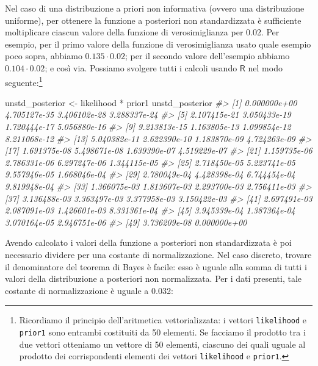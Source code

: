 \documentclass[
]{memoir}
\newenvironment{Shaded}{\begin{snugshade}}{\end{snugshade}}
\newcommand{\CommentTok}[1]{\textcolor[rgb]{0.56,0.35,0.01}{\textit{#1}}}
\newcommand{\NormalTok}[1]{#1}
\newcommand{\OtherTok}[1]{\textcolor[rgb]{0.56,0.35,0.01}{#1}}
\newcommand{\SpecialCharTok}[1]{\textcolor[rgb]{0.00,0.00,0.00}{#1}}
\newcommand{\R}{\textsf{R}} %
\begin{document}
Nel caso di una distribuzione a priori non informativa (ovvero una distribuzione uniforme), per ottenere la funzione a posteriori non standardizzata è sufficiente moltiplicare ciascun valore della funzione di verosimiglianza per 0.02. Per esempio, per il primo valore della funzione di verosimiglianza usato quale esempio poco sopra, abbiamo \(0.135 \cdot 0.02\); per il secondo valore dell'esempio abbiamo \(0.104 \cdot 0.02\); e così via. Possiamo svolgere tutti i calcoli usando \(\R\) nel modo seguente:\footnote{Ricordiamo il principio dell'aritmetica vettorializzata: i vettori \texttt{likelihood} e \texttt{prior1} sono entrambi costituiti da 50 elementi. Se facciamo il prodotto tra i due vettori otteniamo un vettore di 50 elementi, ciascuno dei quali uguale al prodotto dei corrispondenti elementi dei vettori \texttt{likelihood} e \texttt{prior1}.}

\begin{Shaded}
\begin{Highlighting}[]
\NormalTok{unstd\_posterior }\OtherTok{\textless{}{-}}\NormalTok{ likelihood }\SpecialCharTok{*}\NormalTok{ prior1}
\NormalTok{unstd\_posterior}
\CommentTok{\#\textgreater{}  [1] 0.000000e+00 4.705127e{-}35 3.406102e{-}28 3.288337e{-}24}
\CommentTok{\#\textgreater{}  [5] 2.107415e{-}21 3.050433e{-}19 1.720444e{-}17 5.056880e{-}16}
\CommentTok{\#\textgreater{}  [9] 9.213813e{-}15 1.163805e{-}13 1.099854e{-}12 8.211068e{-}12}
\CommentTok{\#\textgreater{} [13] 5.040382e{-}11 2.622390e{-}10 1.183870e{-}09 4.724263e{-}09}
\CommentTok{\#\textgreater{} [17] 1.691375e{-}08 5.498671e{-}08 1.639390e{-}07 4.519229e{-}07}
\CommentTok{\#\textgreater{} [21] 1.159735e{-}06 2.786331e{-}06 6.297247e{-}06 1.344115e{-}05}
\CommentTok{\#\textgreater{} [25] 2.718450e{-}05 5.223741e{-}05 9.557946e{-}05 1.668046e{-}04}
\CommentTok{\#\textgreater{} [29] 2.780049e{-}04 4.428398e{-}04 6.744454e{-}04 9.819948e{-}04}
\CommentTok{\#\textgreater{} [33] 1.366075e{-}03 1.813607e{-}03 2.293700e{-}03 2.756411e{-}03}
\CommentTok{\#\textgreater{} [37] 3.136488e{-}03 3.363497e{-}03 3.377958e{-}03 3.150422e{-}03}
\CommentTok{\#\textgreater{} [41] 2.697491e{-}03 2.087091e{-}03 1.426601e{-}03 8.331361e{-}04}
\CommentTok{\#\textgreater{} [45] 3.945339e{-}04 1.387364e{-}04 3.070164e{-}05 2.946751e{-}06}
\CommentTok{\#\textgreater{} [49] 3.736209e{-}08 0.000000e+00}
\end{Highlighting}
\end{Shaded}

Avendo calcolato i valori della funzione a posteriori non standardizzata è poi necessario dividere per una costante di normalizzazione. Nel caso discreto, trovare il denominatore del teorema di Bayes è facile: esso è uguale alla somma di tutti i valori della distribuzione a posteriori non normalizzata. Per i dati presenti, tale costante di normalizzazione è uguale a 0.032:
\end{document}
